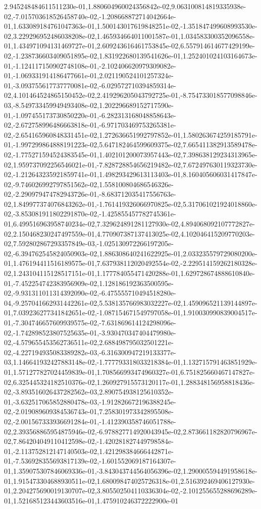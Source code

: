 2.945248484611511230e-01,1.880604960024356842e-02,9.063100814819335938e-02,-7.015703618526458740e-02,-1.208668872714042664e-01,1.633089184761047363e-01,1.500143017619848251e-02,-1.351847499608993530e-02,3.229296952486038208e-02,1.465934664011001587e-01,1.034583300352096558e-01,1.434971094131469727e-01,2.609243616461753845e-02,6.557914614677429199e-02,-1.238736603409051895e-02,1.831922680139541626e-01,1.252401024103164673e-01,-1.124117150902748108e-01,-2.102406620979309082e-01,-1.069331914186477661e-01,2.021190524101257324e-01,-3.093755617737770081e-02,-6.029572710394859314e-02,4.101464524865150452e-02,2.419296205043792725e-01,-8.754733018577098846e-03,-8.549733459949493408e-02,1.202296689152717590e-01,-1.097455173730850220e-01,-6.282313168048858643e-02,-2.672758996486663818e-01,-6.971703469753265381e-02,-2.654165960848331451e-02,1.272636651992797852e-01,1.580263674259185791e-01,-1.997299864888191223e-02,5.647182464599609375e-02,7.665411382913589478e-02,-1.775271594524383545e-01,1.402101200073957443e-02,7.398638129234313965e-02,1.959737092256546021e-01,-7.828728854656219482e-02,7.672497630119323730e-02,-1.212643235921859741e-01,1.498293429613113403e-01,8.160405606031417847e-02,-9.746026992797851562e-02,1.558100804686546326e-02,-2.290979474782943726e-01,-8.683712035417556763e-02,1.849977374076843262e-01,-1.761419326066970825e-02,5.317061021924018860e-02,-3.853081911802291870e-02,-1.425855457782745361e-01,6.499516963958740234e-02,7.329624891281127930e-02,4.894068092107772827e-02,2.150468230247497559e-01,4.770907387137413025e-02,4.102046415209770203e-02,7.592802867293357849e-03,-1.025130972266197205e-02,-6.394762545824050903e-02,1.886308640241622925e-01,2.033235579729080200e-01,1.476194411516189575e-01,7.637938112020492554e-02,-2.229514159262180328e-02,1.243104115128517151e-01,1.177784055471420288e-01,1.629728674888610840e-01,-7.452254742383956909e-02,1.128186192363500595e-02,-9.931311011314392090e-02,-6.475555710494518280e-04,-9.257041662931442261e-02,5.538135766983032227e-02,1.459096521139144897e-01,7.039236277341842651e-02,-1.087154671549797058e-01,1.910030990839004517e-01,-7.304746657609939575e-02,-7.631869614124298096e-02,-1.742898523807525635e-01,-3.930470347404479980e-02,-4.579655453562736511e-02,2.688498795032501221e-02,-4.227194935083389282e-03,-6.316300947219133377e-03,1.146641932427883148e-02,-1.777793318033218384e-01,1.132715791463851929e-01,1.571277827024459839e-01,1.708566993474960327e-01,6.751825660467147827e-02,6.325445324182510376e-02,1.260927915573120117e-01,1.288348156958818436e-02,-3.893516026437282562e-03,2.890754938125610352e-01,-3.632517065852880478e-03,-1.912826672196388245e-02,-2.019089609384536743e-01,7.258301973342895508e-02,-2.001567333936691284e-01,-1.412390358746051788e-02,2.393568865954875946e-02,-6.978827714920043945e-02,2.873661182820796967e-02,7.864204049110412598e-02,-1.420281827449798584e-01,-2.113752812147140503e-02,1.421298384666442871e-01,-7.536928355693817139e-02,-1.601552069187164307e-01,1.359075307846069336e-01,-3.843043744564056396e-02,1.290005594491958618e-01,1.915473304688930511e-02,1.680098474025726318e-01,2.516392469406127930e-01,2.204275690019130707e-02,3.805502504110336304e-02,-2.101255655288696289e-01,1.521685123443603516e-01,1.475910246372222900e-01
